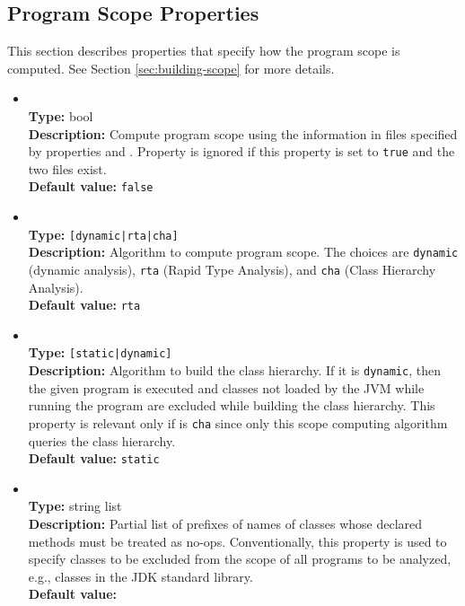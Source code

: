 \subsection{Program Scope Properties}
\label{sec:scope-props}

This section describes properties that specify how the program scope is computed.
See Section \ref{sec:building-scope} for more details.

\begin{itemize}
\item
{} \\
{\bf Type:} bool \\
{\bf Description:} Compute program scope using the information in files specified by properties  and .  Property  is ignored if this property is set to {\tt true} and the two files exist. \\
{\bf Default value:} {\tt false}

\item
{} \\
{\bf Type:} {\tt [dynamic|rta|cha]} \\
{\bf Description:} Algorithm to compute program scope.  The choices are {\tt dynamic} (dynamic analysis), {\tt rta} (Rapid Type Analysis), and {\tt cha} (Class Hierarchy Analysis). \\
{\bf Default value:} {\tt rta}

\item
{} \\
{\bf Type:} {\tt [static|dynamic]} \\
{\bf Description:} Algorithm to build the class hierarchy.  If it is {\tt dynamic}, then the given program is executed and classes not loaded by the JVM while running the program are excluded while building the class hierarchy.  This property is relevant only if  is {\tt cha} since only this scope computing algorithm queries the class hierarchy. \\
{\bf Default value:} {\tt static} 


\item
{} \\
{\bf Type:} string list \\
{\bf Description:} Partial list of prefixes of names of classes whose declared methods must be treated as no-ops.  Conventionally, this property is used to specify classes to be
excluded from the scope of all programs to be analyzed, e.g., classes in the JDK standard library.  \\
{\bf Default value:} 


\end{itemize}

